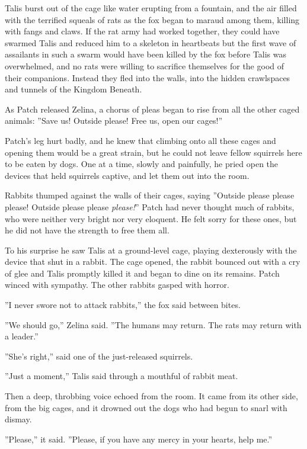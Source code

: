\documentclass[12pt]{book}
\begin{document}
Talis burst out of the cage like water erupting from a fountain, and the air filled with the terrified squeals of rats as the fox began to maraud among them, killing with fangs and claws. If the rat army had worked together, they could have swarmed Talis and reduced him to a skeleton in heartbeats %
but the first wave of assailants in such a swarm would have been killed by the fox before Talis was overwhelmed, and no rats were willing to sacrifice themselves for the good of their companions. Instead they fled into the walls, into the hidden crawlspaces and tunnels of the Kingdom Beneath.

As Patch released Zelina, a chorus of pleas began to rise from all the other caged animals: ''Save us! Outside please! Free us, open our cages!''

Patch's leg hurt badly, and he knew that climbing onto all these cages and opening them would be a great strain, but he could not leave fellow squirrels here to be eaten by dogs. One at a time, slowly and painfully, he pried open the devices that held squirrels captive, and let them out into the room.

Rabbits thumped against the walls of their cages, saying ''Outside please please please! Outside please please {\it please!}'' Patch had never thought much of rabbits, who were neither very bright nor very eloquent. He felt sorry for these ones, but he did not have the strength to free them all.

To his surprise he saw Talis at a ground-level cage, playing dexterously with the device that shut in a rabbit. The cage opened, the rabbit bounced out with a cry of glee %
and Talis promptly killed it and began to dine on its remains. Patch winced with sympathy. The other rabbits gasped with horror.

''I never swore not to attack rabbits,'' the fox said between bites.

''We should go,'' Zelina said. ''The humans may return. The rats may return with a leader.''

''She's right,'' said one of the just-released squirrels.

''Just a moment,'' Talis said through a mouthful of rabbit meat.

Then a deep, throbbing voice echoed from the room. It came from its other side, from the big cages, and it drowned out the dogs who had begun to snarl with dismay.

''Please,'' it said. ''Please, if you have any mercy in your hearts, help me.''
\end{document}
